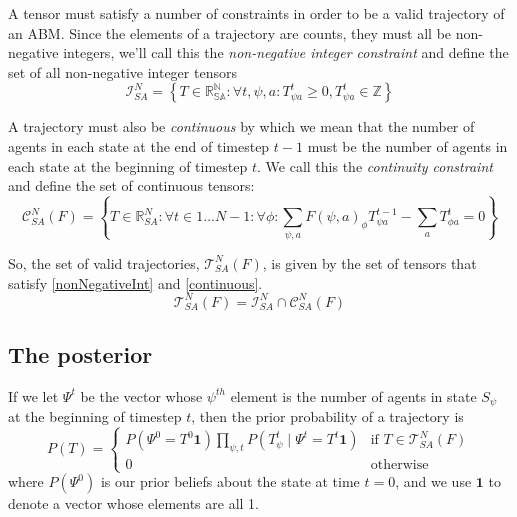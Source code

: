 \documentclass{article}
\begin{document}
A tensor must satisfy a number of constraints in order to be a valid trajectory of an ABM. Since the elements of a trajectory are counts, they must all be non-negative integers, we'll call this the \textit{non-negative integer constraint} and define the set of all non-negative integer tensors
\begin{equation}
\mathcal{I}^N_{SA} = \left\{ T \in \mathbb{R^N_{SA}}: \forall t,\psi, a: T^t_{\psi a} \ge 0, T^t_{\psi a} \in \mathbb{Z}\right\}
\label{nonNegativeInt}
\end{equation}

A trajectory must also be \textit{continuous} by which we mean that the number of agents in each state at the end of timestep $t-1$ must be the number of agents in each state at the beginning of timestep $t$. We call this the \textit{continuity constraint} and define the set of continuous tensors:
\begin{equation}
\mathcal{C}^N_{SA}(F) = \left\{T\in\mathbb{R}^N_{SA}:  \forall t \in 1 ... N-1:\forall \phi: \sum_{\psi, a} F(\psi, a)_\phi T^{t-1}_{\psi a} - \sum_a T^t_{\phi a} = 0\right\}
\label{continuous}
\end{equation}

So, the set of valid trajectories, $\mathcal{T}^N_{SA}(F)$, is given by the set of tensors that satisfy \eqref{nonNegativeInt} and \eqref{continuous}.
\begin{equation}
\mathcal{T}^N_{SA}(F) = \mathcal{I}^N_{SA} \cap \mathcal{C}^N_{SA}(F)
\end{equation}


\subsection{The posterior}

If we let $\Psi^t$ be the vector whose $\psi^{th}$ element is the number of agents in state $S_\psi$ at the beginning of timestep $t$, then the prior probability of a trajectory is
\[
P(T) =
\begin{cases}
P\left(\Psi^0 = T^0 \mathbf{1} \right) \prod_{\psi, t} P\left(T^t_{\psi} \mid \Psi^t = T^t \mathbf{1}\right) & \text{if } T \in \mathcal{T}^N_{SA}(F) \\
0 & \text{otherwise}
\end{cases}
\]
where $P(\Psi^0)$ is our prior beliefs about the state at time $t=0$, and we use $\mathbf{1}$ to denote a vector whose elements are all 1.
\end{document}
